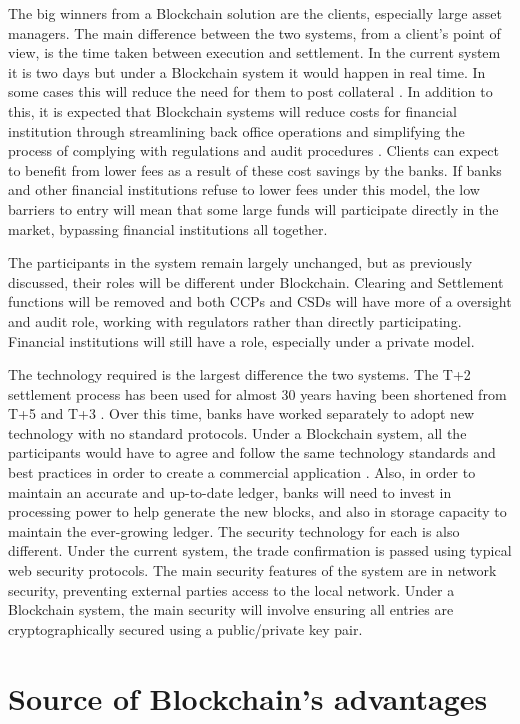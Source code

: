 \documentclass{article}
\begin{document}
The big winners from a Blockchain solution are the clients, especially large asset managers. The main difference between the two systems, from a client's point of view, is the time taken between execution and settlement. In the current system it is two days but under a Blockchain system it would happen in real time. In some cases this will reduce the need for them to post collateral \cite{gentleIntro}. In addition to this, it is expected that Blockchain systems will reduce costs for financial institution through streamlining back office operations and simplifying the process of complying with regulations and audit procedures \cite{DBS}. Clients can expect to benefit from lower fees as a result of these cost savings by the banks. If banks and other financial institutions refuse to lower fees under this model, the low barriers to entry will mean that some large funds will participate directly in the market, bypassing financial institutions all together.

The participants in the system remain largely unchanged, but as previously discussed, their roles will be different under Blockchain. Clearing and Settlement functions will be removed and both CCPs and CSDs will have more of a oversight and audit role, working with regulators rather than directly participating. Financial institutions will still have a role, especially under a private model.

The technology required is the largest difference the two systems. The T+2 settlement process has been used for almost 30 years having been shortened from T+5 and T+3 \cite{CCP}. Over this time, banks have worked separately to adopt new technology with no standard protocols. Under a Blockchain system, all the participants would have to agree and follow the same technology standards and best practices in order to create a commercial application \cite{Deloitte}. Also, in order to maintain an accurate and up-to-date ledger, banks will need to invest in processing power to help generate the new blocks, and also in storage capacity to maintain the ever-growing ledger. The security technology for each is also different. Under the current system, the trade confirmation is passed using typical web security protocols. The main security features of the system are in network security, preventing external parties access to the local network. Under a Blockchain system, the main security will involve ensuring all entries are cryptographically secured using a public/private key pair.

\section{Source of Blockchain's advantages}
\end{document}
